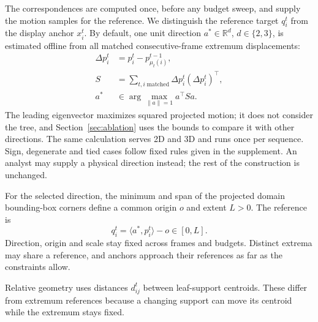 \documentclass[review]{vgtc}
\begin{document}
The correspondences are computed once, before any budget sweep, and supply the motion samples for the reference. We distinguish the reference target $q_i^t$ from the display anchor $x_i^t$. By default, one unit direction $a^*\in\mathbb{R}^d$, $d\in\{2,3\}$, is estimated offline from all matched consecutive-frame extremum displacements:
\begin{equation}\label{eq:autodirection}
\begin{aligned}
 \Delta p_i^t&=p_i^t-p_{\mu_t(i)}^{t-1},\\
 S&=\sum_{t,i\;\mathrm{matched}}\Delta p_i^t(\Delta p_i^t)^\top,\\
 a^*&\in\arg\max_{\|a\|=1}a^\top Sa.
\end{aligned}
\end{equation}
The leading eigenvector maximizes squared projected motion; it does not consider the tree, and Section~\ref{sec:ablation} uses the bounds to compare it with other directions. The same calculation serves 2D and 3D and runs once per sequence. Sign, degenerate and tied cases follow fixed rules given in the supplement. An analyst may supply a physical direction instead; the rest of the construction is unchanged.

For the selected direction, the minimum and span of the projected domain bounding-box corners define a common origin $o$ and extent $L>0$. The reference is
\begin{equation}\label{eq:reference}
 q_i^t=\langle a^*,p_i^t\rangle-o\in[0,L].
\end{equation}
Direction, origin and scale stay fixed across frames and budgets. Distinct extrema may share a reference, and anchors approach their references as far as the constraints allow.

Relative geometry uses distances $d_{ij}^t$ between leaf-support centroids. These differ from extremum references because a changing support can move its centroid while the extremum stays fixed.
\end{document}
